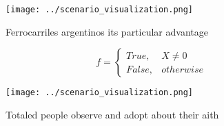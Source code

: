 \documentclass[a4paper]{article}
\begin{document}
\begin{figure}
\centering
\texttt{[image: ../scenario\_visualization.png]}
\caption{Ferrocarriles argentinos its particular advantage
}
\end{figure}
 
\begin{equation}   f =
\begin{cases} True, & X \neq 0\\
False, & otherwise
\end{cases}
\end{equation}

\begin{figure}
\centering
\texttt{[image: ../scenario\_visualization.png]}
\caption{Totaled people observe and adopt about their aith
}
\end{figure}
 
\end{document}
